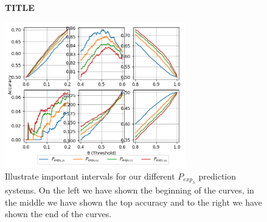 \begin{description}
        \begin{figure}
            \centering
            \textbf{TITLE}\par\medskip
            \includegraphics[width=0.7\textwidth]{./pictures/discussion/conv_char_nn_prediction_zoom.png}
            \caption{Illustrate important intervals for our different
            $P_{exp_\lambda}$ prediction systems. On the left we have shown the
            beginning of the curves, in the middle we have shown the top
            accuracy and to the right we have shown the end of the curves.}
            \label{fig:conv_char_prediction_zoom}
        \end{figure}

\end{description}
